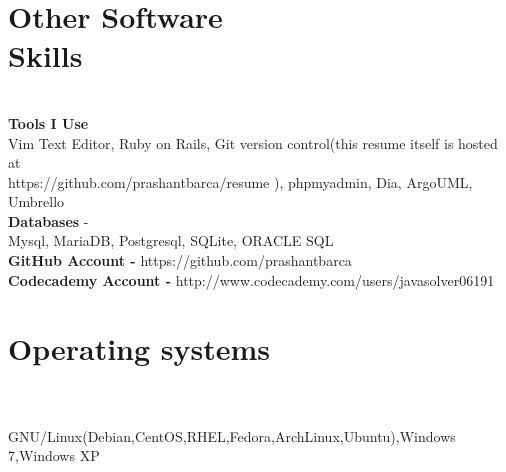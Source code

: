 \documentclass[margin,line]{resume}
\begin{document}
\begin{resume}
    \section{\mysidestyle Other Software\\Skills} \\
    \textbf{Tools I Use}  \\Vim Text Editor, Ruby on Rails, Git version control(this resume itself is hosted at \\https://github.com/prashantbarca/resume ), phpmyadmin, Dia, ArgoUML, Umbrello
    \\\textbf{Databases} - \\Mysql, MariaDB, Postgresql, SQLite, ORACLE SQL
    \\\textbf{GitHub Account -}  https://github.com/prashantbarca
    \\\textbf{Codecademy Account -}  http://www.codecademy.com/users/javasolver06191
    \\\section{\mysidestyle Operating systems}\\ 
    \\ GNU/Linux(Debian,CentOS,RHEL,Fedora,ArchLinux,Ubuntu),Windows 7,Windows XP 



\end{resume}
\end{document}
